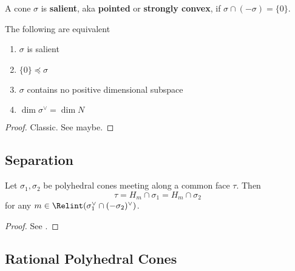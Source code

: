 \begin{definition}
  \label{1-2-12-salient-cone}
  \uses{}
  \leanok

  A cone $\sigma$ is {\bf salient}, aka {\bf pointed} or {\bf strongly convex}, if $\sigma \cap (-\sigma) = \{0\}$.
\end{definition}


\begin{proposition}
  \label{1-2-12-salient-cone-tfae}

  The following are equivalent
  \begin{enumerate}
    \item $\sigma$ is salient
    \item $\{0\} \preceq \sigma$
    \item $\sigma$ contains no positive dimensional subspace
    \item $\dim \sigma^\vee = \dim N$
  \end{enumerate}
\end{proposition}
\begin{proof}
  \uses{}

  Classic. See \cite{Oda_1988} maybe.
\end{proof}


\subsection{Separation}


\begin{lemma}
  \label{1-2-13-separation-lemma}

  Let $\sigma_1, \sigma_2$ be polyhedral cones meeting along a common face $\tau$. Then
  $$\tau = H_m \cap \sigma_1 = H_m \cap \sigma_2$$
  for any $m \in \Relint(\sigma_1^\vee \cap (-\sigma_2)^\vee)$.
\end{lemma}
\begin{proof}

  See \cite{Cox_2011}.
\end{proof}


\subsection{Rational Polyhedral Cones}


